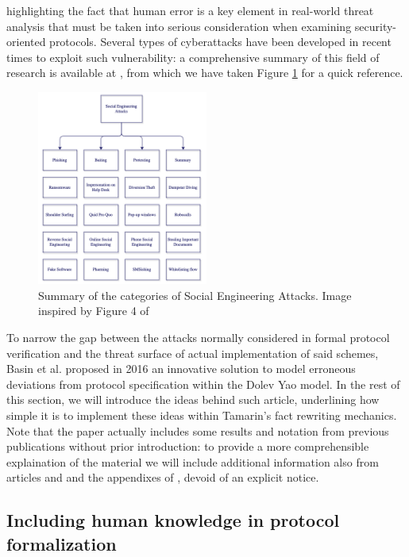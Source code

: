 \documentclass{article}
\begin{document}
highlighting the fact that human error is a key element in real-world threat analysis that must be taken into serious consideration when examining security-oriented protocols. Several types of cyberattacks have been developed in recent times to exploit such vulnerability: a comprehensive summary of this field of research is available at \cite{Salahdine_2019}, from which we have taken Figure \ref{fig:social_engineering_attacks} for a quick reference.

\begin{figure}[htbp]
    \centering
    \includegraphics[width=0.5\textwidth]{images/socialengineeringattacks.png}
    \caption{Summary of the categories of Social Engineering Attacks. Image inspired by Figure 4 of \cite{Salahdine_2019}}
    \label{fig:social_engineering_attacks}
  \end{figure}
  
To narrow the gap between the attacks normally considered in formal protocol verification and the threat surface of actual implementation of said schemes, Basin et al. proposed in 2016 \cite{Basin_2016} an innovative solution to model erroneous deviations from protocol specification within the Dolev Yao model. In the rest of this section, we will introduce the ideas behind such article, underlining how simple it is to implement these ideas within Tamarin's fact rewriting mechanics. Note that the paper actually includes some results and notation from previous publications without prior introduction: to provide a more comprehensible explaination of the material we will include additional information also from articles \cite{Lowe_1997} and \cite{Basin_2015} and the appendixes of \cite{Basin_2016}, devoid of an explicit notice.

\subsection{Including human knowledge in protocol formalization}
\end{document}

